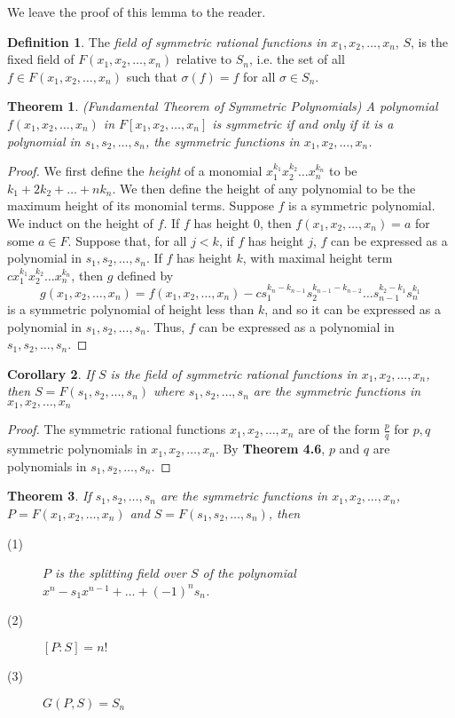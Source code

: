 \documentclass[12pt,leqno]{article}
\numberwithin{equation}{section}
\theoremstyle{plain}
\newtheorem{thm}{Theorem}[section]
\newtheorem{cor}[thm]{Corollary}
\theoremstyle{definition}
\newtheorem*{Def}{Definition}
\theoremstyle{remark}
\begin{document}
We leave the proof of this lemma to the reader.

\begin{Def}
 The \textit{field of symmetric rational functions in $x_1,x_2,\hdots,x_n$}, $S$, is the fixed field of $F(x_1,x_2,\hdots,x_n)$ relative to $S_n$, i.e. the set of all $f\in F(x_1,x_2,\hdots,x_n)$ such that $\sigma(f)=f$ for all $\sigma\in S_n$. 
\end{Def}

\begin{thm}(Fundamental Theorem of Symmetric Polynomials)
 A polynomial $f(x_1,x_2,\hdots,x_n)$ in $F[x_1,x_2,\hdots,x_n]$ is symmetric if and only if it is a polynomial in $s_1,s_2,\hdots,s_n$, the symmetric functions in $x_1,x_2,\hdots,x_n$.
\end{thm}

\begin{proof}
 We first define the \textit{height} of a monomial $x_1^{k_1}x_2^{k_2}\hdots x_n^{k_n}$ to be $k_1+2k_2+\hdots+nk_n$. We then define the height of any polynomial to be the maximum height of its monomial terms. Suppose $f$ is a symmetric polynomial. We induct on the height of $f$. If $f$ has height 0, then $f(x_1,x_2,\hdots,x_n)=a$ for some $a\in F$. Suppose that, for all $j<k$, if $f$ has height $j$, $f$ can be expressed as a polynomial in $s_1,s_2,\hdots,s_n$. If $f$ has height $k$, with maximal height term $cx_1^{k_1}x_2^{k_2}\hdots x_n^{k_n}$, then $g$ defined by\[g(x_1,x_2,\hdots,x_n)=f(x_1,x_2,\hdots,x_n)-cs_1^{k_n-k_{n-1}}s_2^{k_{n-1}-k_{n-2}}\hdots s_{n-1}^{k_2-k_1}s_n^{k_1}\] is a symmetric polynomial of height less than $k$, and so it can be expressed as a polynomial in $s_1,s_2,\hdots,s_n$. Thus, $f$ can be expressed as a polynomial in $s_1,s_2,\hdots,s_n$.\qedhere
\end{proof}

\begin{cor}
 If $S$ is the field of symmetric rational functions in $x_1,x_2,\hdots,x_n$, then $S=F(s_1,s_2,\hdots,s_n)$ where $s_1,s_2,\hdots,s_n$ are the symmetric functions in $x_1,x_2,\hdots,x_n$
\end{cor}

\begin{proof}
 The symmetric rational functions $x_1,x_2,\hdots,x_n$ are of the form $\frac{p}{q}$ for $p,q$ symmetric polynomials in $x_1,x_2,\hdots,x_n$. By \textbf{Theorem 4.6}, $p$ and $q$ are polynomials in $s_1,s_2,\hdots,s_n$.
\end{proof}

\begin{thm}
 If $s_1,s_2,\hdots,s_n$ are the symmetric functions in $x_1,x_2,\hdots,x_n$, $P=F(x_1,x_2,\hdots,x_n)$ and $S=F(s_1,s_2,\hdots,s_n)$, then
\begin{description}
 \item [(1)] $P$ is the splitting field over $S$ of the polynomial $x^n-s_1x^{n-1}+\hdots+(-1)^ns_n$.
 \item [(2)] $[P:S]=n!$
 \item [(3)] $G(P,S)=S_n$
\end{description}
\end{thm}
\end{document}
